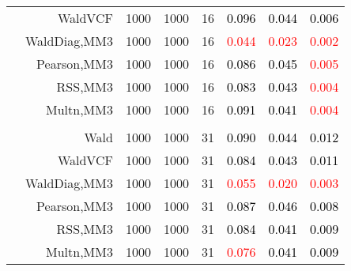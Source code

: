 \documentclass[
]{article}
\begin{document}
\begin{table}[H]
{\begin{tabular}[t]{lrrrrrrr}
\hspace{1em} & WaldVCF & 1000 & 1000 & 16 & \textcolor{black}{0.096} & \textcolor{black}{0.044} & \textcolor{black}{0.006}\\

\hspace{1em} & WaldDiag,MM3 & 1000 & 1000 & 16 & \textcolor{red}{0.044} & \textcolor{red}{0.023} & \textcolor{red}{0.002}\\

\hspace{1em} & Pearson,MM3 & 1000 & 1000 & 16 & \textcolor{black}{0.086} & \textcolor{black}{0.045} & \textcolor{red}{0.005}\\

\hspace{1em} & RSS,MM3 & 1000 & 1000 & 16 & \textcolor{black}{0.083} & \textcolor{black}{0.043} & \textcolor{red}{0.004}\\

\hspace{1em} & Multn,MM3 & 1000 & 1000 & 16 & \textcolor{black}{0.091} & \textcolor{black}{0.041} & \textcolor{red}{0.004}\\
\cmidrule{1-8}
\addlinespace[0.3em]
\multicolumn{8}{l}{\textbf{3F 15V}}\\
\hspace{1em} & Wald & 1000 & 1000 & 31 & \textcolor{black}{0.090} & \textcolor{black}{0.044} & \textcolor{black}{0.012}\\

\hspace{1em} & WaldVCF & 1000 & 1000 & 31 & \textcolor{black}{0.084} & \textcolor{black}{0.043} & \textcolor{black}{0.011}\\

\hspace{1em} & WaldDiag,MM3 & 1000 & 1000 & 31 & \textcolor{red}{0.055} & \textcolor{red}{0.020} & \textcolor{red}{0.003}\\

\hspace{1em} & Pearson,MM3 & 1000 & 1000 & 31 & \textcolor{black}{0.087} & \textcolor{black}{0.046} & \textcolor{black}{0.008}\\

\hspace{1em} & RSS,MM3 & 1000 & 1000 & 31 & \textcolor{black}{0.084} & \textcolor{black}{0.041} & \textcolor{black}{0.009}\\

\hspace{1em} & Multn,MM3 & 1000 & 1000 & 31 & \textcolor{red}{0.076} & \textcolor{black}{0.041} & \textcolor{black}{0.009}\\
\bottomrule
\end{tabular}}
\endgroup{}
\end{table}
\end{document}
